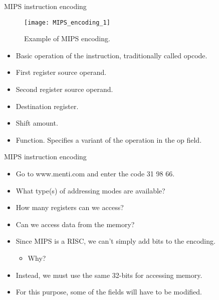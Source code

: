 % 
\begin{frame}{\acs{MIPS} instruction encoding}
  \begin{figure}
  \centering
  \texttt{[image: MIPS\_encoding\_1]}
  \caption{Example of \acs{MIPS} encoding.}
  \label{Figure:MIPS32_encoding_1}
  \end{figure}
    \begin{itemize}
  \item {} Basic operation of the instruction, traditionally called \alert{opcode}.
  \item {} First register source operand.
  \item {} Second register source operand.
  \item {} Destination register.
  \item {} Shift amount.
  \item {} Function. Specifies a variant of the operation in the op field.
  \end{itemize}
\end{frame}

% 
\begin{frame}{\acs{MIPS} instruction encoding}
    \begin{itemize}
    \item Go to www.menti.com and enter the code 31 98 66.
    \pauseprint
    \item What type(s) of addressing modes are available?
    \item How many registers can we access?
    \item Can we access data from the memory?
    \pauseprint
    \item Since \ac{MIPS} is a \ac{RISC}, we can't simply add bits to the encoding.
    \begin{itemize}
    \item Why?
        \pauseprint
    \end{itemize}
    \item Instead, we must use the same 32-bits for accessing memory.
    \item For this purpose, some of the fields will have to be modified.
  \end{itemize}
\end{frame}

